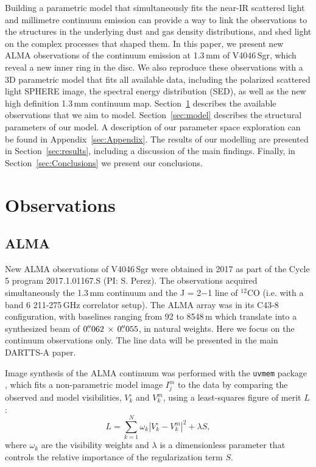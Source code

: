 \documentclass[fleqn,usenatbib,useAMS]{mnras}
\begin{document}
Building  a parametric model that simultaneously fits the near-IR scattered light and millimetre continuum emission  can provide a way to link the observations to the structures in the underlying dust and gas density distributions, and shed light on the complex processes that shaped them. In this paper, we present new ALMA observations of the continuum emission at 1.3\,mm of V4046\,Sgr, which reveal a new inner ring in the disc. We also reproduce these observations with a 3D parametric model that fits all available data, including the polarized scattered light SPHERE image, the spectral energy distribution (SED), as well as the new high definition 1.3\,mm continuum map. Section~\ref{sec:Observations} describes the available observations that we aim to model. Section~\ref{sec:model} describes the structural parameters of our model. A description of our parameter space exploration can be found in Appendix~\ref{sec:Appendix}. The results of our modelling are presented in Section~\ref{sec:results}, including a discussion of the main findings. Finally, in Section~\ref{sec:Conclusions} we present our conclusions.

\section{Observations} \label{sec:Observations}
\subsection{ALMA}  \label{subsec:ALMA}

New ALMA observations of V4046\,Sgr were obtained in 2017 as part of the Cycle 5 program 2017.1.01167.S (PI: S. Perez). The observations acquired simultaneously the 1.3\,mm continuum and the J = 2$-$1 line of $^{12}$CO (i.e. with a band 6 211-275\,GHz correlator setup). The ALMA array was in its C43-8 configuration, with baselines ranging from 92 to 8548\,m which translate into a synthesized beam of $0\hbox{$.\!\!^{\prime\prime}$}062 \,\times \, 0\hbox{$.\!\!^{\prime\prime}$}055$, in natural weights. Here we focus on the continuum observations only. The line data will be presented in the main DARTTS-A paper.

Image synthesis of the ALMA continuum was performed with the {\tt uvmem} package \citep{2006ApJ...639..951C, 2018A&C....22...16C}, which fits a non-parametric model image $I^m_j$ to the data by comparing the observed and model visibilities, $V^\circ_k$ and $V^m_k$, using a least-squares figure of merit $L$:
\begin{equation}
  L = \sum_{k=1}^N \omega_k  |V^\circ_k - V^m_k|^2 + \lambda S,
\end{equation}
where $\omega_k$ are the visibility weights and $\lambda$ is a dimensionless parameter that controls the relative importance of the regularization term $S$.
\end{document}
